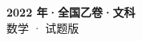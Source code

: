 \documentclass[zihao=-4, a4paper]{ctexart}
\begin{document}
\begin{center}
  {\Large\bfseries 2022 年·全国乙卷·文科}\\[4pt]
  {\large 数学 · 试题版}
\end{center}
\medskip
{}

\end{document}
